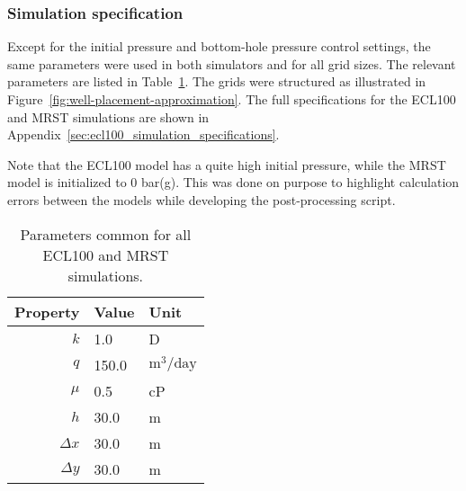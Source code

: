 \subsubsection{Simulation specification} %
\label{ssub:simulation_specification}
Except for the initial pressure and bottom-hole pressure control settings, the same parameters were used in both simulators and for all grid sizes. The relevant parameters are listed in Table~\ref{tbl:simulation-parameters}. The grids were structured as illustrated in Figure~\ref{fig:well-placement-approximation}. The full specifications for the ECL100 and MRST simulations are shown in Appendix~\ref{sec:ecl100_simulation_specifications}.

Note that the ECL100 model has a quite high initial pressure, while the MRST model is initialized to 0 bar(g). This was done on purpose to highlight calculation errors between the models while developing the post-processing script.

\begin{table}
    \caption{Parameters common for all ECL100 and MRST simulations.}
    \centering
    \begin{tabular}{rll}
        \toprule
        Property & Value & Unit \\
        \midrule
        $k$        & 1.0   & D                           \\
        $q$        & 150.0 & $\mathrm{m}^3/\mathrm{day}$ \\
        $\mu$      & 0.5   & cP                          \\
        $h$        & 30.0  & m                           \\
        $\Delta x$ & 30.0  & m                           \\
        $\Delta y$ & 30.0  & m                           \\
        \bottomrule
    \end{tabular}
    \label{tbl:simulation-parameters}
\end{table}


